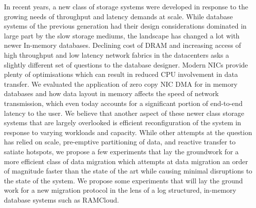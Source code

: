 
In recent years, a new class of storage systems were developed in response to
the growing needs of throughput and latency demands at scale. While 
database systems of the previous generation had their design considerations dominated
in large part by the slow storage mediums, the landscape has changed a lot with 
newer In-memory databases. Declining cost of DRAM and increasing access of high
throughput and low latency network fabrics in the datacenters asks a slightly 
different set of questions to the database designer. Modern NICs provide plenty 
of optimisations which can result in reduced CPU involvement in data transfer.
We evaluated the application of zero copy NIC DMA for in memory databases and 
how data layout in memory affects the speed of network transmission, which even today
accounts for a significant portion of end-to-end latency to the user. We believe
that another aspect of these newer class storage systems that are largely overlooked 
is efficient reconfiguration of the system in response to varying workloads and capacity.
While other attempts at the question has relied on scale, pre-emptive partitioning of data,
and reactive transfer to satiate hotspots, we propose a few experiments that lay the groundwork
for a more efficient class of data migration which attempts at data migration an order of 
magnitude faster than the state of the art while causing minimal disruptions to the state 
of the system. We propose some experiments that will lay the ground work for a new migration
protocol in the lens of a log structured, in-memory database systems such as RAMCloud.

